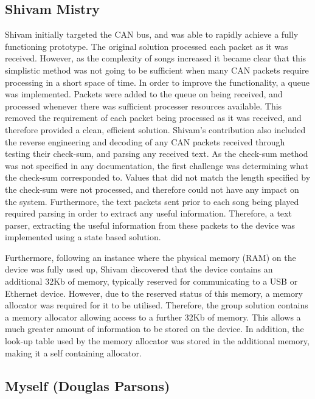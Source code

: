 \subsection*{Shivam Mistry}
Shivam initially targeted the CAN bus, and was able to rapidly achieve a fully 
functioning prototype. The original solution processed each packet as it was 
received. However, as the complexity of songs increased it became clear that this 
simplistic method was not going to be sufficient when many CAN packets require 
processing in a short space of time.
In order to improve the functionality, a queue was implemented. Packets were 
added to the queue on being received, and processed whenever there was sufficient
processer resources available.
This removed the requirement of each packet being processed as it was received,
 and therefore provided a clean, efficient solution.
Shivam's contribution also included the reverse engineering and decoding of any
 CAN packets received through testing their check-sum, and parsing any received 
text.
As the check-sum method was not specified in any documentation, the first 
challenge was determining what the check-sum corresponded to. Values that did 
not match the length specified by the check-sum were not processed, and therefore 
could not have any impact on the system. Furthermore, the text packets sent prior 
to each song being played required parsing in order to extract any useful 
information. Therefore, a text parser, extracting the useful information from 
these packets to the device was implemented using a state based solution. 

Furthermore, following an 
instance where the physical memory (RAM) on the device was fully used up, Shivam 
discovered that the device contains an additional 32Kb of memory, 
typically reserved for communicating to a USB or Ethernet device. However, 
due to the reserved status of this memory, a memory allocator was required for 
it to be utilised. 
Therefore, the group solution contains a memory allocator allowing access to 
a further 32Kb of memory. This allows a much greater amount of information to be 
stored on the device. 
In addition, the look-up table used by the memory allocator was stored in the 
additional memory, making it a self containing allocator. 

\subsection*{Myself (Douglas Parsons)}

